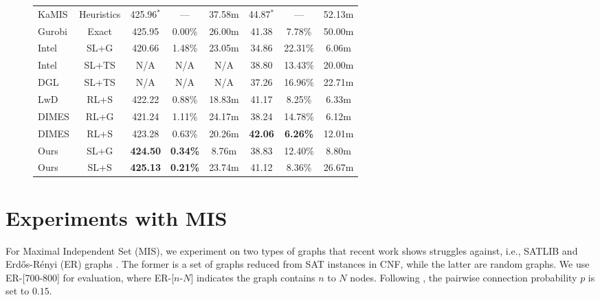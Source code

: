 \documentclass{article}
\theoremstyle{plain}
\theoremstyle{definition}
\theoremstyle{remark}
\begin{document}
\begin{figure}[t]
\begin{minipage}{0.57\textwidth}
\begin{center}
\begin{small}
\begin{sc}
{\begin{tabular}{l c ccc ccc}
\midrule
KaMIS&Heuristics
&425.96$^*$&---&37.58$\mathrm{m}$ &44.87$^*$&---&52.13$\mathrm{m}$ \\
Gurobi&Exact &
425.95& 0.00\%& 26.00$\mathrm{m}$ &  41.38 & 7.78\% & 50.00$\mathrm{m}$ \\
\midrule
Intel & SL+G & 420.66 & 1.48\% & 23.05$\mathrm{m}$ & 34.86 & 22.31\% & 6.06$\mathrm{m}$ \\
Intel & SL+TS & N/A & N/A & N/A & 38.80 & 13.43\% & 20.00m  \\
DGL   & SL+TS & N/A & N/A & N/A & 37.26 & 16.96\% & 22.71$\mathrm{m}$ \\
LwD & RL+S & 422.22 & 0.88\% & 18.83$\mathrm{m}$ & 41.17 & 8.25\% & 6.33$\mathrm{m}$ \\
DIMES &RL+G& 421.24 & 1.11\% & 24.17$\mathrm{m}$ & 38.24 & 14.78\% & 6.12$\mathrm{m}$ \\
DIMES &RL+S& 423.28 & 0.63\% & 20.26$\mathrm{m}$ & \textbf{42.06} & \textbf{6.26\%} & 12.01$\mathrm{m}$ \\
\midrule
Ours & SL+G & \textbf{424.50} & \textbf{0.34\%} & 8.76$\mathrm{m}$ & 38.83 & 12.40\% & 8.80$\mathrm{m}$\\
Ours & SL+S & \textbf{425.13} & \textbf{0.21\%} & 23.74$\mathrm{m}$ & 41.12 & 8.36\% & 26.67$\mathrm{m}$ \\
\bottomrule
\end{tabular}
}
\end{sc}
\end{small}
\end{center}
\end{minipage}
\vspace{-0.1in}
\end{figure}
\setlength{\tabcolsep}{6pt}


\section{Experiments with MIS} \label{sec:mis}
For Maximal Independent Set (MIS), we experiment on two types of graphs that recent work \citep{li2018combinatorial,ahn2020learning,other2022whats,qiudimes} shows struggles against, i.e., SATLIB \citep{hoos2000satlib} and Erd{\H{o}}s-R{\'e}nyi (ER) graphs \citep{erdHos1960evolution}. The former is a set of graphs reduced from SAT instances in CNF, while the latter are random graphs. We use ER-[700-800] for evaluation, where ER-[$n$-$N$] indicates the graph contains $n$ to $N$ nodes. Following \citet{qiudimes}, the pairwise connection probability $p$ is set to $0.15$.
\end{document}
